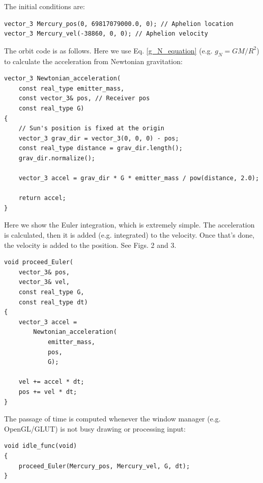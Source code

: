 \documentclass[12pt]{article}
\begin{document}
The initial conditions are:
\begin{lstlisting}
vector_3 Mercury_pos(0, 69817079000.0, 0); // Aphelion location
vector_3 Mercury_vel(-38860, 0, 0); // Aphelion velocity
\end{lstlisting}

The orbit code is as follows. 
Here we use Eq. \ref{g_N_equation} (e.g. $g_N = {G M}/{R^2}$) to calculate the acceleration from Newtonian gravitation:
\begin{lstlisting}
vector_3 Newtonian_acceleration(
	const real_type emitter_mass,
	const vector_3& pos, // Receiver pos
	const real_type G)
{
	// Sun's position is fixed at the origin
	vector_3 grav_dir = vector_3(0, 0, 0) - pos;
	const real_type distance = grav_dir.length();
	grav_dir.normalize();

	vector_3 accel = grav_dir * G * emitter_mass / pow(distance, 2.0);

	return accel;
}
\end{lstlisting}

Here we show the Euler integration, which is extremely simple.
The acceleration is calculated, then it is added (e.g. integrated) to the velocity.
Once that's done, the velocity is added to the position.
See Figs. 2 and 3.
\begin{lstlisting}
void proceed_Euler(
	vector_3& pos, 
	vector_3& vel, 
	const real_type G, 
	const real_type dt)
{
	vector_3 accel = 
		Newtonian_acceleration(
			emitter_mass, 
			pos, 
			G);

	vel += accel * dt;
	pos += vel * dt;
}

\end{lstlisting}

The passage of time is computed whenever the window manager (e.g. OpenGL/GLUT) is not busy drawing or processing input:
\begin{lstlisting}
void idle_func(void)
{
	proceed_Euler(Mercury_pos, Mercury_vel, G, dt);
}
\end{lstlisting}
\end{document}
